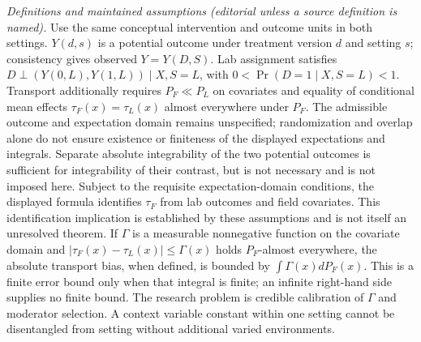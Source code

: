 \documentclass[11pt,a4paper]{article}
\begin{document}
\emph{Definitions and maintained assumptions (editorial unless a source definition is named).} Use the same conceptual intervention and outcome units in both settings. \(Y(d,s)\) is a potential outcome under treatment version \(d\) and setting \(s\); consistency gives observed \(Y=Y(D,S)\). Lab assignment satisfies \(D\perp(Y(0,L),Y(1,L))\mid X,S=L\), with \(0<\Pr(D=1\mid X,S=L)<1\). Transport additionally requires \(P_F\ll P_L\) on covariates and equality of conditional mean effects \(\tau_F(x)=\tau_L(x)\) almost everywhere under \(P_F\). The admissible outcome and expectation domain remains unspecified; randomization and overlap alone do not ensure existence or finiteness of the displayed expectations and integrals. Separate absolute integrability of the two potential outcomes is sufficient for integrability of their contrast, but is not necessary and is not imposed here. Subject to the requisite expectation-domain conditions, the displayed formula identifies \(\tau_F\) from lab outcomes and field covariates. This identification implication is established by these assumptions and is not itself an unresolved theorem. If \(\Gamma\) is a measurable nonnegative function on the covariate domain and \(|\tau_F(x)-\tau_L(x)|\le\Gamma(x)\) holds \(P_F\)-almost everywhere, the absolute transport bias, when defined, is bounded by \(\int\Gamma(x)dP_F(x)\). This is a finite error bound only when that integral is finite; an infinite right-hand side supplies no finite bound. The research problem is credible calibration of \(\Gamma\) and moderator selection. A context variable constant within one setting cannot be disentangled from setting without additional varied environments.
\end{document}
